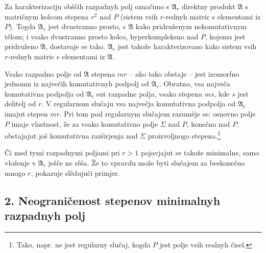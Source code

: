 \documentclass[11pt]{article}
\newcommand{\mA}{\mathfrak{A}}
\begin{document}
\noindent Za harakterizaciju obščih razpadnyh polj označimo s $\mA_r$ direktny produkt $\mA$ s matričnym kolcom stepena $r^2$ nad $P$ (sistem vsih $r$-rednyh matric s elementami iz $P$). Togda $\mA_r$ jest dvustranno prosto, s $\mA$ kako pridruženym nekomutativnym tělom; i vsako dvustranno prosto kolco, hyperkompleksno nad $P$, kojemu jest pridruženo $\mA$, dostavaje se tako. $\mA_r$ jest takože harakterizovano kako sistem vsih $r$-rednyh matric s elementami iz $\mA$.

\medskip

\noindent Vsako razpadno polje od $\mA$ stepena $mr$ -- ako tako obstaje -- jest izomorfno jednomu iz največih komutativnyh podpolj od $\mA_r$. Obratno, vsa največa komutativna podpolja od $\mA_r$ sut razpadne polja, vsako stepena $ms$, kde $s$ jest delitelj od $r$. V regularnom slučaju vsa največja komutativna podpolja od $\mA_r$ imajut stepen $mr$. Pri tom pod regularnym slučajem razuměje se: osnovno polje $P$ imaje vlastnost, že za vsako komutativno polje $\Sigma$ nad $P$, konečno nad $P$, obstajajut još komutativna razširjenja nad $\Sigma$ proizvoljnogo stepena.\footnote{Tako, napr. ne jest regularny slučaj, kogda $P$ jest polje vsih realnyh čisel.}

\medskip

\noindent Či med tymi razpadnymi poljami pri $r>1$ pojavjajut se takože minimalne, samo vloženje v $\mA_r$ ješče ne rěša. Že to vpravdu može byti slučajem za beskonečno mnogo $r$, pokazuje slědujuči primjer.

\subsection*{2. Neograničenost stepenov minimalnyh razpadnyh polj}
\end{document}
